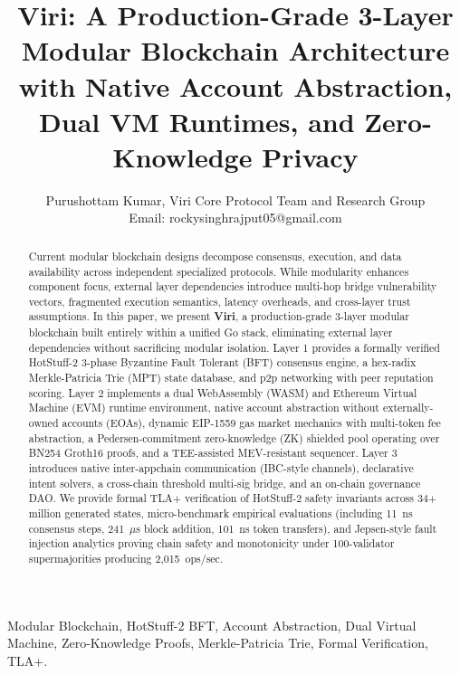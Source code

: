 \documentclass[10pt,journal,compsoc,twocolumn]{IEEEtran}
\begin{document}
\title{Viri: A Production-Grade 3-Layer Modular Blockchain Architecture with Native Account Abstraction, Dual VM Runtimes, and Zero-Knowledge Privacy}

\author{Purushottam Kumar, Viri Core Protocol Team and Research Group\\
Email: rockysinghrajput05@gmail.com
}

\maketitle

\begin{abstract}
Current modular blockchain designs decompose consensus, execution, and data availability across independent specialized protocols. While modularity enhances component focus, external layer dependencies introduce multi-hop bridge vulnerability vectors, fragmented execution semantics, latency overheads, and cross-layer trust assumptions. In this paper, we present \textbf{Viri}, a production-grade 3-layer modular blockchain built entirely within a unified Go stack, eliminating external layer dependencies without sacrificing modular isolation. Layer 1 provides a formally verified HotStuff-2 3-phase Byzantine Fault Tolerant (BFT) consensus engine, a hex-radix Merkle-Patricia Trie (MPT) state database, and p2p networking with peer reputation scoring. Layer 2 implements a dual WebAssembly (WASM) and Ethereum Virtual Machine (EVM) runtime environment, native account abstraction without externally-owned accounts (EOAs), dynamic EIP-1559 gas market mechanics with multi-token fee abstraction, a Pedersen-commitment zero-knowledge (ZK) shielded pool operating over BN254 Groth16 proofs, and a TEE-assisted MEV-resistant sequencer. Layer 3 introduces native inter-appchain communication (IBC-style channels), declarative intent solvers, a cross-chain threshold multi-sig bridge, and an on-chain governance DAO. We provide formal TLA+ verification of HotStuff-2 safety invariants across 34+ million generated states, micro-benchmark empirical evaluations (including 11~ns consensus steps, 241~$\mu$s block addition, 101~ns token transfers), and Jepsen-style fault injection analytics proving chain safety and monotonicity under 100-validator supermajorities producing 2,015~ops/sec.
\end{abstract}

\begin{IEEEkeywords}
Modular Blockchain, HotStuff-2 BFT, Account Abstraction, Dual Virtual Machine, Zero-Knowledge Proofs, Merkle-Patricia Trie, Formal Verification, TLA+.
\end{IEEEkeywords}
\end{document}
